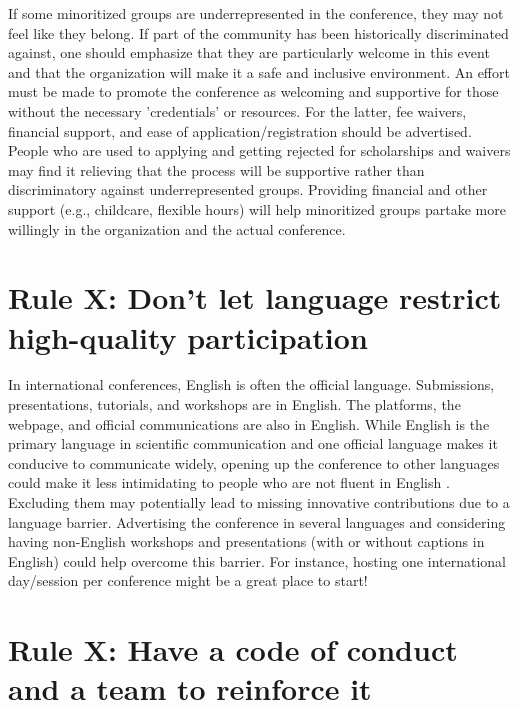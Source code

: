 \documentclass[10pt,letterpaper]{article}
\begin{document}
If some minoritized groups are underrepresented in the conference, they may not feel like they belong. 
If part of the community has been historically discriminated against, one should emphasize that they are particularly welcome in this event and that the organization will make it a safe and inclusive environment. 
An effort must be made to promote the conference as welcoming and supportive for those without the necessary 'credentials' or resources. For the latter, fee waivers, financial support, and ease of application/registration should be advertised. People who are used to applying and getting rejected for scholarships and waivers may find it relieving that the process will be supportive rather than discriminatory against underrepresented groups. Providing financial and other support (e.g., childcare, flexible hours) will help minoritized groups partake more willingly in the organization and the actual conference.

\section{Rule X: Don't let language restrict high-quality participation}

In international conferences, English is often the official language. Submissions, presentations, tutorials, and workshops are in English. The platforms, the webpage, and official communications are also in English. While English is the primary language in scientific communication and one official language makes it conducive to communicate widely, opening up the conference to other languages could make it less intimidating to people who are not fluent in English \cite{niner_better_2021}. Excluding them may potentially lead to missing innovative contributions due to a language barrier. Advertising the conference in several languages and considering having non-English workshops and presentations (with or without captions in English) could help overcome this barrier. For instance, hosting one international day/session per conference might be a great place to start!

\section{Rule X: Have a code of conduct and a team to reinforce it}
\end{document}

